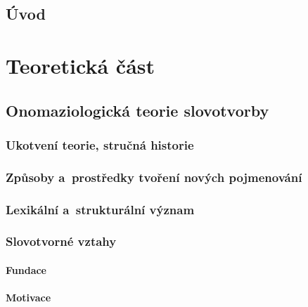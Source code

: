 \hypertarget{uxfavod}{%
\chapter*{Úvod}\label{uvod}
}

\part{Teoretická část}

\hypertarget{onomaziologickuxe1-teorie-slovotvorby}{%
\chapter{Onomaziologická teorie
slovotvorby}\label{onomaziologickuxe1-teorie-slovotvorby}}

\hypertarget{ukotvenuxed-teorie-struux10dnuxe1-historie}{%
\section{Ukotvení teorie, stručná
historie}\label{ukotvenuxed-teorie-struux10dnuxe1-historie}}

\hypertarget{zpux16fsoby-a-prostux159edky-tvoux159enuxed-novuxfdch-pojmenovuxe1nuxed}{%
\section{Způsoby a~prostředky tvoření nových
pojmenování}\label{zpux16fsoby-a-prostux159edky-tvoux159enuxed-novuxfdch-pojmenovuxe1nuxed}}

\hypertarget{lexikuxe1lnuxed-a-strukturuxe1lnuxed-vuxfdznam}{%
\section{Lexikální a~strukturální
význam}\label{lexikuxe1lnuxed-a-strukturuxe1lnuxed-vuxfdznam}}

\hypertarget{slovotvornuxe9-vztahy}{%
\section{Slovotvorné vztahy}\label{slovotvornuxe9-vztahy}}

\hypertarget{fundace}{%
\subsection{Fundace}\label{fundace}}

\hypertarget{motivace}{%
\subsection{Motivace}\label{motivace}}

